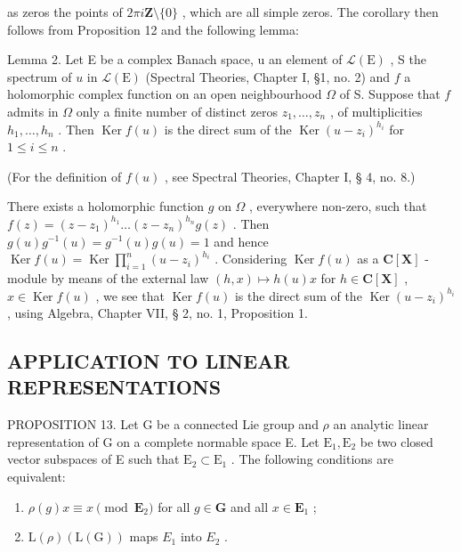 as zeros the points of \(2\pi i\mathbf{Z}\setminus\{0\}\) , which are all simple zeros. The corollary then follows from Proposition 12 and the following lemma:

Lemma 2. Let E be a complex Banach space, u an element of \(\mathcal{L}(\mathrm{E})\) , S the spectrum of \(u\) in \(\mathcal{L}(\mathrm{E})\) (Spectral Theories, Chapter I, §1, no. 2) and \(f\) a holomorphic complex function on an open neighbourhood \(\Omega\) of S. Suppose that \(f\) admits in \(\Omega\) only a finite number of distinct zeros \(z_{1},\ldots ,z_{n}\) , of multiplicities \(h_1,\dots,h_n\) . Then \(\operatorname {Ker}f(u)\) is the direct sum of the \(\operatorname {Ker}(u - z_i)^{h_i}\) for \(1\leqslant i\leqslant n\) .

(For the definition of \(f(u)\) , see Spectral Theories, Chapter I, § 4, no. 8.)

There exists a holomorphic function \(g\) on \(\Omega\) , everywhere non-zero, such that \(f(z) = (z - z_1)^{h_1} \ldots (z - z_n)^{h_n} g(z)\) . Then \(g(u)g^{-1}(u) = g^{-1}(u)g(u) = 1\) and hence \(\operatorname{Ker}f(u) = \operatorname{Ker}\prod_{i=1}^{n}(u - z_i)^{h_i}\) . Considering \(\operatorname{Ker}f(u)\) as a \(\mathbf{C}[\mathbf{X}]\) -module by means of the external law \((h,x)\mapsto h(u)x\) for \(h\in \mathbf{C}[\mathbf{X}]\) , \(x\in \operatorname{Ker}f(u)\) , we see that \(\operatorname{Ker} f(u)\) is the direct sum of the \(\operatorname{Ker}(u - z_i)^{h_i}\) , using Algebra, Chapter VII, § 2, no. 1, Proposition 1.

\subsection{APPLICATION TO LINEAR REPRESENTATIONS}

PROPOSITION 13. Let G be a connected Lie group and \(\rho\) an analytic linear representation of G on a complete normable space E. Let \(\mathrm{E}_1, \mathrm{E}_2\) be two closed vector subspaces of E such that \(\mathrm{E}_2 \subset \mathrm{E}_1\) . The following conditions are equivalent:

\begin{enumerate}
\def\labelenumi{(\roman{enumi})}
\item
  \(\rho(g)x \equiv x \pmod{\mathbf{E}_2}\) for all \(g \in \mathbf{G}\) and all \(x \in \mathbf{E}_1\) ;
\item
  \(\mathrm{L}(\rho)(\mathrm{L}(\mathrm{G}))\) maps \(E_{1}\) into \(E_{2}\) .
\end{enumerate}

